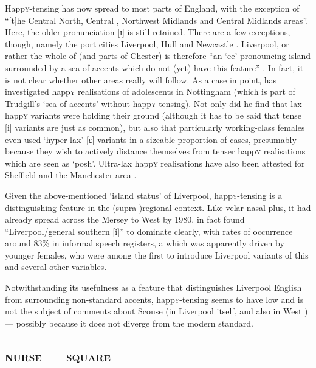Happ\textsc{y}-tensing has now spread to most parts of England, with the exception of ``[t]he Central North, Central , Northwest Midlands and Central Midlands areas''.
Here, the older pronunciation [ɪ] is still retained.
There are a few exceptions, though, namely the port cities Liverpool, Hull and Newcastle \citep[cf.][62]{trudgill1999}.
Liverpool, or rather the whole of  (and parts of Chester) is therefore ``an `ee'-pronouncing island surrounded by a sea of accents which do not (yet) have this feature'' \citep[72]{trudgill1999}.
In fact, it is not clear whether other areas really will follow.
As a case in point, \textcite{flynn2010} has investigated happ\textsc{y} realisations of adolescents in Nottingham (which is part of Trudgill's `sea of accents' without happ\textsc{y}-tensing).
Not only did he find that lax happ\textsc{y} variants were holding their ground (although it has to be said that tense [i] variants are just as common), but also that particularly working-class females even used `hyper-lax' [ɛ] variants in a sizeable proportion of cases, presumably because they wish to actively distance themselves from tenser happ\textsc{y} realisations which are seen as `posh'.
Ultra-lax happ\textsc{y} realisations have also been attested for Sheffield \parencite{stoddartetal1999} and the Manchester area \parencite{watts2006}.

Given the above-mentioned `island status' of Liverpool, happ\textsc{y}-tensing is a distinguishing feature in the (supra-)regional context.
Like velar nasal plus, it had already spread across the Mersey to West  by 1980.
\textcite[97 and 99]{newbrook1999} in fact found ``Liverpool/general southern [i]'' to dominate clearly, with rates of occurrence around 83\% in informal speech registers, a  which was apparently driven by younger females, who were among the first to introduce Liverpool variants of this and several other variables.

Notwithstanding its usefulness as a feature that distinguishes Liverpool English from surrounding non-standard accents, happ\textsc{y}-tensing seems to have low  and is not the subject of comments about Scouse (in Liverpool itself, and also in West ) --- possibly because it does not diverge from the modern standard.

		\subsection{\textsc{nurse} --- \textsc{square}}\label{sec.var.vow.nurse}

